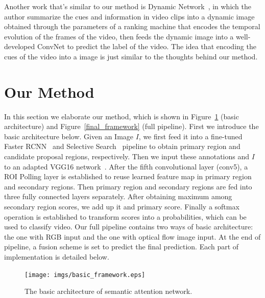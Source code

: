 \documentclass[10pt,twocolumn,letterpaper]{article}
\begin{document}
Another work that's similar to our method is Dynamic Network~\cite{bilen2016dynamic}, in which the author summarize the cues and information in 
video clips into a dynamic image obtained through the parameters of a ranking
machine that encodes the temporal evolution of the frames of the video, then 
feeds the dynamic image into a well-developed ConvNet to predict the label of
the video. The idea that encoding the cues of the video into a image is just
similar to the thoughts behind our method. 

\section{Our Method}\label{sec:attentionNet}
In this section we elaborate our method, which is shown in Figure~\ref{basic_framework} (basic architecture) and Figure~\ref{final_framework} (full pipeline). First we introduce the basic architecture below. Given an Image $I$, we first feed it into a fine-tuned Faster RCNN~\cite{ren2015faster} and Selective Search~\cite{uijlings2013selective} pipeline to obtain primary region and candidate proposal regions, respectively. Then we input these annotations and $I$ to an adapted VGG16 network~\cite{simonyan2014very}. After the fifth convolutional layer (conv5), a ROI Polling layer is established to reuse learned feature map in primary region and secondary regions. Then primary region and secondary regions are fed into three fully connected layers separately. After obtaining maximum among secondary region scores, we add up it and primary score. Finally a softmax operation is established to transform scores into a probabilities, which can be used to classify video. Our full pipeline contains two ways of basic architecture: the one with RGB input and the one with optical flow image input. At the end of pipeline, a fusion scheme is set to predict the final prediction. Each part of implementation is detailed below.
\begin{figure}[!htbp]
	\begin{center}
		\texttt{[image: imgs/basic\_framework.eps]}
		\caption{The basic architecture of semantic attention network. }
		\label{basic_framework}
	\end{center}
\end{figure}
\end{document}
